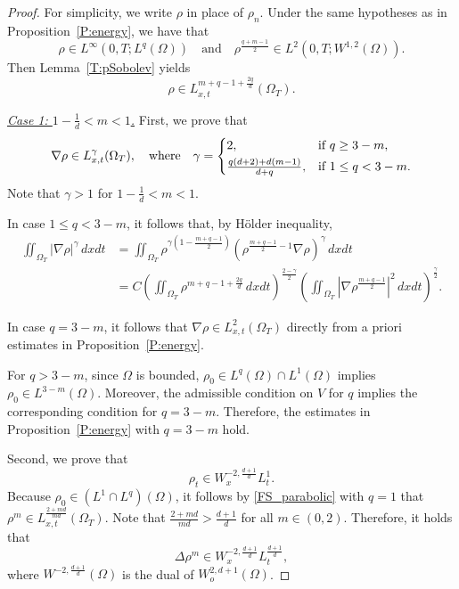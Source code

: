 \documentclass{amsart}
\numberwithin{equation}{section}
\begin{document}
\begin{proof}
For simplicity, we write $\rho$ in place of $\rho_n$.
Under the same hypotheses as in Proposition~\ref{P:energy}, we have that 
\begin{equation}\label{FS001}
 \rho \in L^{\infty}(0, T; L^{q}(\Omega)) \quad \text{and} \quad
 \rho^{\frac{q+m-1}{2}} \in L^{2}(0, T; W^{1,2}(\Omega)).
\end{equation}
Then Lemma~\ref{T:pSobolev} yields 
\begin{equation}\label{FS_parabolic}
\rho \in L^{m+q-1 + \frac{2q}{d}}_{x,t}(\Omega_T).
\end{equation}

\medskip 
\noindent

\underline{\emph{Case 1: $1-\frac{1}{d}<m<1$.}} First, we prove that 
\begin{equation}\label{nabla_rho}
\nabla\rho \in L^{\gamma}_{x,t}(\Omega_T), \quad \text{where} \quad  
\gamma = 
\begin{cases}
    2, & \text{if } q \geq 3-m, \vspace{1mm}\\
	\frac{q(d+2) + d(m-1)}{d+q},  & \text{if } 1\leq q <3-m.
\end{cases}
\end{equation}
Note that $\gamma > 1$ for $1-\frac{1}{d}<m<1$. 

In case $1\leq q < 3-m$, it follows that, by H\"{o}lder inequality,  
\[\begin{aligned}
 \iint_{\Omega_T} |\nabla \rho|^{\gamma} \,dxdt 
 & = \iint_{\Omega_{T}} \rho^{\gamma \left( 1 - \frac{m+q-1}{2}\right)} \left(\rho^{\frac{m+q-1}{2} -1} \nabla \rho \right)^{\gamma}   \,dxdt \\
    &= C \left(\iint_{\Omega_{T}} \rho^{m+q-1+\frac{2q}{d}}   \,dxdt \right)^{\frac{2-\gamma}{2}}	
     \left(\iint_{\Omega_{T}}  \left|\nabla \rho^{\frac{m+q-1}{2}} \right|^{2}\,dxdt \right)^{\frac{\gamma}{2}}.
\end{aligned}\]

In case $q=3-m$, it follows that $\nabla \rho \in L^{2}_{x,t}(\Omega_T)$ directly from a priori estimates in Proposition~\ref{P:energy}. 
 
For $q>3-m$, since $\Omega$ is bounded, $\rho_0\in L^q(\Omega)\cap L^1(\Omega)$ implies $\rho_0\in L^{3-m}(\Omega)$. Moreover, the admissible condition on $V$ for $q$ implies the corresponding condition for $q=3-m$. Therefore, the estimates in Proposition~\ref{P:energy} with $q=3-m$ hold.
   
Second, we prove that 
\begin{equation}\label{rho_t_space}
\rho_t \in W^{-2, \frac{d+1}{d}}_{x} L^{1}_{t}. 
\end{equation}
Because $\rho_0 \in \left(L^{1}\cap L^{q}\right)(\Omega)$,   
it follows by \eqref{FS_parabolic} with $q=1$ that $\rho^m \in L_{x,t}^{\frac{2+md}{md}} (\Omega_{T})$. Note that $\frac{2+md}{md} > \frac{d+1}{d}$ for all $m\in (0,2)$. Therefore, it holds that 
\begin{equation}\label{Delta_rho}
\Delta \rho^m \in W^{-2, \frac{d+1}{d}}_{x} L^{\frac{d+1}{d}}_{t},
\end{equation}
where $W^{-2, \frac{d+1}{d}} (\Omega)$ is the dual of $W^{2, d+1}_{o}(\Omega)$.


\end{proof}
\end{document}

